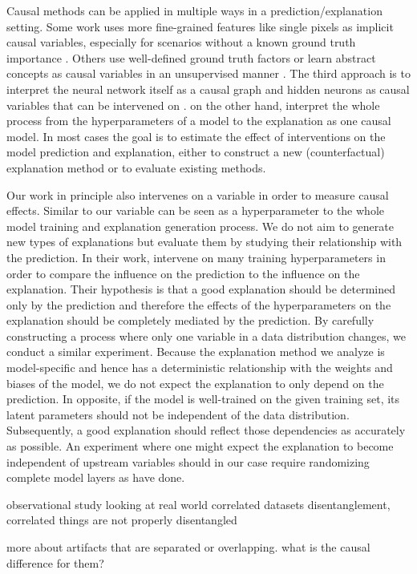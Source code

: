 Causal methods can be applied in multiple ways in a prediction/explanation setting.
Some work uses more fine-grained features like single pixels as implicit causal variables, especially for scenarios without a known ground truth importance \citep{Zeiler2013,Fong2017,Samek2017a}. Others use well-defined ground truth factors or learn abstract concepts as causal variables in an unsupervised manner \citep{Parafita2019, Goyal2019, Tran2022, Reimers2019, Reimers2020, Harradon2018}. The third approach is to interpret the neural network itself as a causal graph and hidden neurons as causal variables that can be intervened on \citep{Narendra2018, Chattopadhyay2019}. \cite{Karimi2023} on the other hand, interpret the whole process from the hyperparameters of a model to the explanation as one causal model. In most cases the goal is to estimate the effect of interventions on the model prediction and explanation, either to construct a new (counterfactual) explanation method or to evaluate existing methods.

Our work in principle also intervenes on a variable in order to measure causal effects. Similar to \cite{Karimi2023} our variable can be seen as a hyperparameter to the whole model training and explanation generation process. We do not aim to generate new types of explanations but evaluate them by studying their relationship with the prediction. In their work, \citet{Karimi2023} intervene on many training hyperparameters in order to compare the influence on the prediction to the influence on the explanation. Their hypothesis is that a good explanation should be determined only by the prediction and therefore the effects of the hyperparameters on the explanation should be completely mediated by the prediction. By carefully constructing a process where only one variable in a data distribution changes, we conduct a similar experiment. Because the explanation method we analyze is model-specific and hence has a deterministic relationship with the weights and biases of the model, we do not expect the explanation to only depend on the prediction. In opposite, if the model is well-trained on the given training set, its latent parameters should not be independent of the data distribution. Subsequently, a good explanation should reflect those dependencies as accurately as possible. An experiment where one might expect the explanation to become independent of upstream variables should in our case require randomizing complete model layers as \cite{Adebayo2018} have done. 

{\color{gray}
observational study looking at real world correlated datasets disentanglement, correlated things are not properly disentangled \cite{Traeuble2021} 

more about artifacts that are separated or overlapping. what is the causal difference for them? 
}